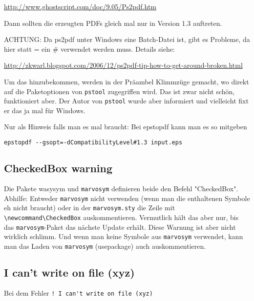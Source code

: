 \url{http://www.ghostscript.com/doc/9.05/Ps2pdf.htm}

Dann sollten die erzeugten PDFs gleich mal nur in Version 1.3 auftreten.

ACHTUNG:
Da ps2pdf unter Windows eine Batch-Datei ist, gibt es Probleme, da hier statt = ein \# verwendet werden muss. Details siehe:

\url{http://zkwarl.blogspot.com/2006/12/ps2pdf-tip-how-to-get-around-broken.html}

%
%
%

Um das hinzubekommen, werden in der Präambel Klimmzüge gemacht, wo direkt auf die Paketoptionen von \texttt{pstool} zugegriffen wird. Das ist zwar nicht schön, funktioniert aber. Der Autor von \texttt{pstool} wurde aber informiert und vielleicht fixt er das ja mal für Windows.

Nur als Hinweis falls man es mal braucht: Bei epstopdf kann man es so mitgeben

\verb+epstopdf --gsopt=-dCompatibilityLevel#1.3 input.eps+

\subsection{CheckedBox warning}
Die Pakete wasysym und \texttt{marvosym} definieren beide den Befehl "CheckedBox". Abhilfe: Entweder \texttt{marvosym} nicht verwenden (wenn man die enthaltenen Symbole eh nicht braucht) oder in der \texttt{marvosym.sty} die Zeile mit \verb+\newcommand\CheckedBox+ auskommentieren. Vermutlich hält das aber nur, bis das \texttt{marvosym}-Paket das nächste Update erhält. Diese Warnung ist aber nicht wirklich schlimm. Und wenn man keine Symbole aus \texttt{marvosym} verwendet, kann man das Laden von \texttt{marvosym} (usepackage) auch auskommentieren.

\subsection{I can't write on file (xyz)}
Bei dem Fehler
\verb+! I can't write on file (xyz)+


